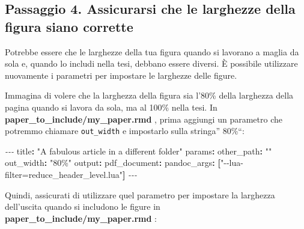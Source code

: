 \documentclass[a4paper, 11pt, nobind]{templates/ociamthesis}
\newenvironment{Shaded}{\begin{snugshade}}{\end{snugshade}}
\newcommand{\AttributeTok}[1]{\textcolor[rgb]{0.77,0.63,0.00}{#1}}
\newcommand{\FunctionTok}[1]{\textcolor[rgb]{0.00,0.00,0.00}{#1}}
\newcommand{\InformationTok}[1]{\textcolor[rgb]{0.56,0.35,0.01}{\textbf{\textit{#1}}}}
\newcommand{\KeywordTok}[1]{\textcolor[rgb]{0.13,0.29,0.53}{\textbf{#1}}}
\newcommand{\PreprocessorTok}[1]{\textcolor[rgb]{0.56,0.35,0.01}{\textit{#1}}}
\newcommand{\StringTok}[1]{\textcolor[rgb]{0.31,0.60,0.02}{#1}}
\renewenvironment{Shaded}
{
  \vspace{10pt}%
  \begin{snugshade}%
}{%
  \end{snugshade}%
  \vspace{8pt}%
}
\begin{document}
\hypertarget{passaggio-4.-assicurarsi-che-le-larghezze-della-figura-siano-corrette}{%
\subsection{Passaggio 4. Assicurarsi che le larghezze della figura siano corrette}\label{passaggio-4.-assicurarsi-che-le-larghezze-della-figura-siano-corrette}}

Potrebbe essere che le larghezze della tua figura quando si lavorano a maglia da sola e, quando lo includi nella tesi, debbano essere diversi.
È possibile utilizzare nuovamente i parametri per impostare le larghezze delle figure.

Immagina di volere che la larghezza della figura sia l'80\% della larghezza della pagina quando si lavora da sola, ma al 100\% nella tesi.
In \textbf{paper\_to\_include/my\_paper.rmd }, prima aggiungi un parametro che potremmo chiamare \texttt{out\_width} e impostarlo sulla stringa'' 80\%``:

\begin{Shaded}
\begin{Highlighting}[]
\PreprocessorTok{{-}{-}{-}}
\FunctionTok{title}\KeywordTok{:}\AttributeTok{ }\StringTok{"A fabulous article in a different folder"}
\FunctionTok{params}\KeywordTok{:}
\AttributeTok{  }\FunctionTok{other\_path}\KeywordTok{:}\AttributeTok{ }\StringTok{""}
\AttributeTok{  }\FunctionTok{out\_width}\KeywordTok{:}\AttributeTok{ }\StringTok{"80\%"}
\FunctionTok{output}\KeywordTok{:}
\AttributeTok{  }\FunctionTok{pdf\_document}\KeywordTok{:}\AttributeTok{ }
\AttributeTok{    }\FunctionTok{pandoc\_args}\KeywordTok{:}\AttributeTok{ }\KeywordTok{[}\StringTok{"{-}{-}lua{-}filter=reduce\_header\_level.lua"}\KeywordTok{]}
\PreprocessorTok{{-}{-}{-}}
\end{Highlighting}
\end{Shaded}

Quindi, assicurati di utilizzare quel parametro per impostare la larghezza dell'uscita quando si includono le figure in \textbf{paper\_to\_include/my\_paper.rmd }:

\begin{Shaded}
\end{Shaded}
\end{document}
